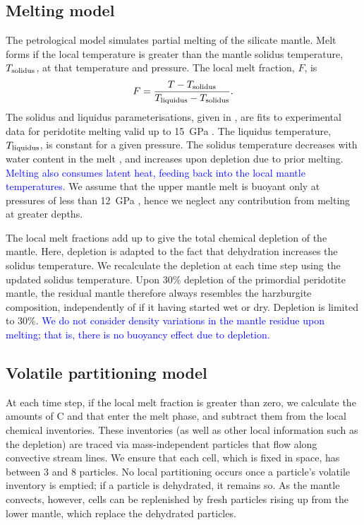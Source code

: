 \documentclass[3p,authoryear]{elsarticle}
\newcommand{\editthree}[2]{\textcolor{blue}{\sout{#1}#2}}
\begin{document}
\subsection{Melting model}
The petrological model simulates partial melting of the silicate mantle. Melt forms if the local temperature is greater than the mantle solidus temperature, $T_{\rm solidus}$, at that temperature and pressure. The local melt fraction, $F$, is
\begin{equation}\label{eq:melt-fraction}
    F = \frac{T - T_{\rm solidus}}{T_{\rm liquidus} - T_{\rm solidus}}.
\end{equation}
The solidus and liquidus parameterisations, given in \citet{noack2014can}, are fits to experimental data for peridotite melting valid up to 15~GPa \citep{smet1999evolution}. The liquidus temperature, $T_{\rm liquidus}$, is constant for a given pressure. The solidus temperature decreases with water content in the melt \citep{Katz2003}, and increases upon depletion due to prior melting. \editthree{}{Melting also consumes latent heat, feeding back into the local mantle temperatures. }We assume that the upper mantle melt is buoyant only at pressures of less than 12~GPa \citep{Ohtani1995}, hence we neglect any contribution from melting at greater depths. 

The local melt fractions add up to give the total chemical depletion of the mantle. Here, depletion is adapted to the fact that dehydration increases the solidus temperature. We recalculate the depletion at each time step using the updated solidus temperature. Upon 30\% depletion of the primordial peridotite mantle, the residual mantle therefore always resembles the harzburgite composition, independently of if it having started wet or dry. Depletion is limited to 30\%.\editthree{}{ We do not consider density variations in the mantle residue upon melting; that is, there is no buoyancy effect due to depletion.}



\subsection{Volatile partitioning model}\label{sec:partitioning-methods}

At each time step, if the local melt fraction is greater than zero, we calculate the amounts of C and  that enter the melt phase, and subtract them from the local chemical inventories. These inventories (as well as other local information such as the depletion) are traced via mass-independent particles that flow along convective stream lines. We ensure that each cell, which is fixed in space, has between 3 and 8 particles. No local partitioning occurs once a particle's volatile inventory is emptied; if a particle is dehydrated, it remains so. As the mantle convects, however, cells can be replenished by fresh particles rising up from the lower mantle, which replace the dehydrated particles. 
\end{document}
